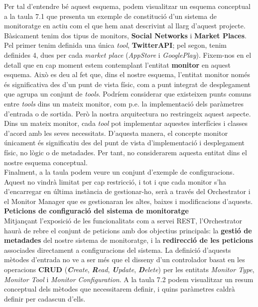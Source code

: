 Per tal d'entendre bé aquest esquema, podem visualitzar un esquema conceptual a la taula 7.1 que presenta un exemple de constitució d'un sistema de monitoratge en actiu com el que hem anat descrivint al llarg d'aquest projecte. Bàsicament tenim dos tipus de monitors, \textbf{Social Networks} i \textbf{Market Places}. Pel primer tenim definida una única \textit{tool}, \textbf{TwitterAPI}; pel segon, tenim definides 4, dues per cada \textit{market place} (\textit{AppStore} i \textit{GooglePlay}). Fixem-nos en el detall que en cap moment estem contemplant l'entitat \textbf{monitor} en aquest esquema. Això es deu al fet que, dins el nostre esquema, l'entitat monitor només és significativa des d'un punt de vista físic, com a punt integrat de desplegament que agrupa un conjunt de \textit{tools}. Podríem considerar que existeixen punts comuns entre \textit{tools} dins un mateix monitor, com p.e. la implementació dels paràmetres d'entrada o de sortida. Però la nostra arquitectura no restringeix aquest aspecte. Dins un mateix monitor, cada \textit{tool} pot implementar aquestes interfícies i classes d'acord amb les seves necessitats. D'aquesta manera, el concepte monitor únicament és significatiu des del punt de vista d'implementació i desplegament físic, no lògic o de metadades. Per tant, no considerarem aquesta entitat dins el nostre esquema conceptual.\\

Finalment, a la taula podem veure un conjunt d'exemple de configuracions. Aquest no vindrà limitat per cap restricció, i tot i que cada monitor s'ha d'encarregar en última instància de gestionar-ho, serà a través del Orchestrator i el Monitor Manager que es gestionaran les altes, baixes i modificacions d'aquests.\\

\noindent \textbf{\large Peticions de configuració del sistema de monitoratge}\\

\noindent Mitjançant l'exposició de les funcionalitats com a servei REST, l'Orchestrator haurà de rebre el conjunt de peticions amb dos objectius principals: la \textbf{gestió de metadades} del nostre sistema de monitoratge, i la \textbf{redirecció de les peticions} associades directament a configuracions del sistema. La definició d'aquests mètodes d'entrada no ve a ser més que el disseny d'un controlador basat en les operacions \textbf{CRUD} (\textit{\textbf{C}reate}, \textit{\textbf{R}ead}, \textit{\textbf{U}pdate}, \textit{\textbf{D}elete}) per les entitats \textit{Monitor Type}, \textit{Monitor Tool} i \textit{Monitor Configuration}. A la taula 7.2 podem visualitzar un resum conceptual dels mètodes que necessitarem definir, i quins paràmetres caldrà definir per cadascun d'ells.\\

